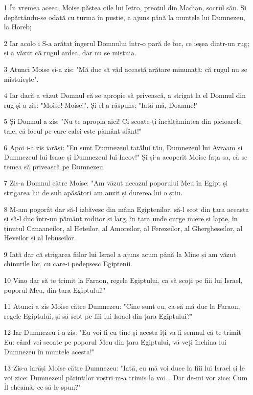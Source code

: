 \par 1 În vremea aceea, Moise păștea oile lui Ietro, preotul din Madian, socrul său. Și depărtându-se odată cu turma în pustie, a ajuns până la muntele lui Dumnezeu, la Horeb;
\par 2 Iar acolo i S-a arătat îngerul Domnului într-o pară de foc, ce ieșea dintr-un rug; și a văzut că rugul ardea, dar nu se mistuia.
\par 3 Atunci Moise și-a zis: "Mă duc să văd această arătare minunată: că rugul nu se mistuiește".
\par 4 Iar dacă a văzut Domnul că se apropie să privească, a strigat la el Domnul din rug și a zis: "Moise! Moise!". Și el a răspuns: "Iată-mă, Doamne!"
\par 5 Și Domnul a zis: "Nu te apropia aici! Ci scoate-ți încălțămintea din picioarele tale, că locul pe care calci este pământ sfânt!"
\par 6 Apoi i-a zis iarăși: "Eu sunt Dumnezeul tatălui tău, Dumnezeul lui Avraam și Dumnezeul lui Isaac și Dumnezeul lui Iacov!" Și și-a acoperit Moise fața sa, că se temea să privească pe Dumnezeu.
\par 7 Zis-a Domnul către Moise: "Am văzut necazul poporului Meu în Egipt și strigarea lui de sub apăsători am auzit și durerea lui o știu.
\par 8 M-am pogorât dar să-l izbăvesc din mâna Egiptenilor, să-l scot din țara aceasta și să-l duc într-un pământ roditor și larg, în țara unde curge miere și lapte, în ținutul Canaaneilor, al Heteilor, al Amoreilor, al Ferezeilor, al Ghergheseilor, al Heveilor și al Iebuseilor.
\par 9 Iată dar că strigarea fiilor lui Israel a ajuns acum până la Mine și am văzut chinurile lor, cu care-i pedepsesc Egiptenii.
\par 10 Vino dar să te trimit la Faraon, regele Egiptului, ca să scoți pe fiii lui Israel, poporul Meu, din țara Egiptului!"
\par 11 Atunci a zis Moise către Dumnezeu: "Cine sunt eu, ca să mă duc la Faraon, regele Egiptului, și să scot pe fiii lui Israel din țara Egiptului?"
\par 12 Iar Dumnezeu i-a zis: "Eu voi fi cu tine și acesta îți va fi semnul că te trimit Eu: când vei scoate pe poporul Meu din țara Egiptului, vă veți închina lui Dumnezeu în muntele acesta!"
\par 13 Zis-a iarăși Moise către Dumnezeu: "Iată, eu mă voi duce la fiii lui Israel și le voi zice: Dumnezeul părinților voștri m-a trimis la voi... Dar de-mi vor zice: Cum Îl cheamă, ce să le spun?"
